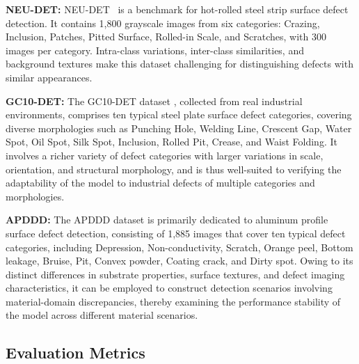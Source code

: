 \documentclass[pdflatex,sn-nature]{sn-jnl}
\begin{document}
\textbf{NEU-DET:} NEU-DET~\cite{Song2013NEU} is a benchmark for hot-rolled steel strip surface defect detection. It contains 1,800 grayscale images from six categories: Crazing, Inclusion, Patches, Pitted Surface, Rolled-in Scale, and Scratches, with 300 images per category. Intra-class variations, inter-class similarities, and background textures make this dataset challenging for distinguishing defects with similar appearances.

\textbf{GC10-DET:} The GC10-DET dataset \cite{Lv2020GC10}, collected from real industrial environments, comprises ten typical steel plate surface defect categories, covering diverse morphologies such as Punching Hole, Welding Line, Crescent Gap, Water Spot, Oil Spot, Silk Spot, Inclusion, Rolled Pit, Crease, and Waist Folding. It involves a richer variety of defect categories with larger variations in scale, orientation, and structural morphology, and is thus well-suited to verifying the adaptability of the model to industrial defects of multiple categories and morphologies.


\textbf{APDDD:} The APDDD dataset \cite{tianchi2018aluminium} is primarily dedicated to aluminum profile surface defect detection, consisting of 1,885 images that cover ten typical defect categories, including Depression, Non-conductivity, Scratch, Orange peel, Bottom leakage, Bruise, Pit, Convex powder, Coating crack, and Dirty spot. Owing to its distinct differences in substrate properties, surface textures, and defect imaging characteristics, it can be employed to construct detection scenarios involving material-domain discrepancies, thereby examining the performance stability of the model across different material scenarios.

\subsection{Evaluation Metrics}
\end{document}
